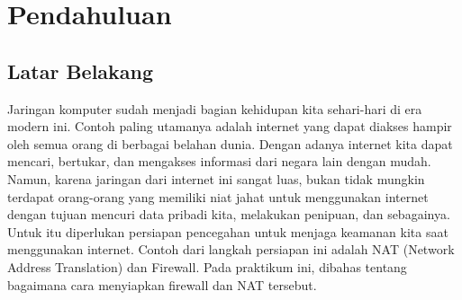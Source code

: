\section{Pendahuluan}
\subsection{Latar Belakang}
Jaringan komputer sudah menjadi bagian kehidupan kita sehari-hari di era modern ini. Contoh paling utamanya adalah internet yang dapat diakses hampir oleh semua orang di berbagai belahan dunia. Dengan adanya internet kita dapat mencari, bertukar, dan mengakses informasi dari negara lain dengan mudah. Namun, karena jaringan dari internet ini sangat luas, bukan tidak mungkin terdapat orang-orang yang memiliki niat jahat untuk menggunakan internet dengan tujuan mencuri data pribadi kita, melakukan penipuan, dan sebagainya. Untuk itu diperlukan persiapan pencegahan untuk menjaga keamanan kita saat menggunakan internet. Contoh dari langkah persiapan ini adalah NAT (Network Address Translation) dan Firewall. Pada praktikum ini, dibahas tentang bagaimana cara menyiapkan firewall dan NAT tersebut.

